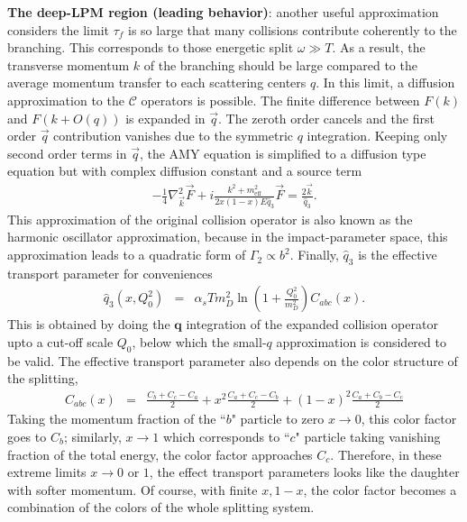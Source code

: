 {\bf The deep-LPM region (leading behavior)}: another useful approximation considers the limit $\tau_f$ is so large that many collisions contribute coherently to the branching. 
This corresponds to those energetic split $\omega \gg T$.
As a result, the transverse momentum $k$ of the branching should be large compared to the average momentum transfer to each scattering centers $q$.
In this limit, a diffusion approximation to the $\mathcal{C}$ operators is possible.
The finite difference between $F(k)$ and $F(k+O(q))$ is expanded in $\vec{q}$. 
The zeroth order cancels and the first order $\vec{q}$ contribution  vanishes due to the symmetric $q$ integration.
Keeping only second order terms in $\vec{q}$, the AMY equation is simplified to a diffusion type equation but with complex diffusion constant and a source term
\begin{eqnarray}
- \frac{1}{4} \nabla^2_{\vec{k}}\vec{F} + i\frac{k^2 + m^2_{\textrm{eff}}}{2x(1-x)E\hat{q}_3}\vec{F} = \frac{2\vec{k}}{\hat{q}_3}.
\end{eqnarray}
This approximation of the original collision operator is also known as the harmonic oscillator approximation, because in the impact-parameter space, this approximation leads to a quadratic form of $\Gamma_2 \propto b^2$.
Finally, $\hat{q}_3$ is the effective transport parameter for conveniences 
\begin{eqnarray}
\hat{q}_3(x, Q_0^2) &=& \alpha_s T m_D^2 \ln\left(1+\frac{Q_0^2}{m_D^2}\right) C_{abc}(x).\label{eq:qhat3}
\end{eqnarray}
This is obtained by doing the $\mathbf{q}$ integration of the expanded collision operator upto a cut-off scale $Q_0$, below which the small-$q$ approximation is considered to be valid.
The effective transport parameter also depends on the color structure of the splitting,
\begin{eqnarray}
C_{abc}(x) &=&  \frac{C_b+C_c-C_a}{2} + x^2 \frac{C_a+C_c-C_b}{2} +(1-x)^2\frac{C_a+C_b-C_c}{2}
\end{eqnarray}
Taking the momentum fraction of the ``$b$" particle to zero $x\rightarrow 0$, this color factor goes to $C_b$; similarly, $x\rightarrow 1$ which corresponds to ``$c$" particle taking vanishing fraction of the total energy, the color factor approaches $C_c$.
Therefore, in these extreme limits $x\rightarrow 0$ or $1$, the effect transport parameters looks like the daughter with softer momentum.
Of course, with finite $x, 1-x$, the color factor becomes a combination of the colors of the whole splitting system.

